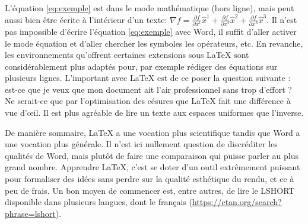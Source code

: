	L'équation \ref{eq:exemple} est dans le mode mathématique (hors ligne), mais peut aussi bien être écrite à l'intérieur d'un texte:
	\(
	\nabla f =%
	\frac{\partial f}{\partial x^1}\widehat{x}^1%
	+\frac{\partial f}{\partial x^2}\widehat{x}^2%
	+\frac{\partial f}{\partial x^3}\widehat{x}^3
	\).
	Il n'est pas impossible d'écrire l'équation \ref{eq:exemple} avec Word, il suffit d'aller activer le mode équation et d'aller chercher les symboles les opérateurs, etc. En revanche, les environnements qu'offrent certaines extensions sous \LaTeX{} sont considérablement plus adaptés pour, par exemple rédiger des équations sur plusieurs lignes. L'important avec \LaTeX{} est de ce poser la question suivante : est-ce que je veux que mon document ait l'air professionnel sans trop d'effort ? Ne serait-ce que par l'optimisation des césures que \LaTeX{} fait une différence à vue d'\oe il. Il est plus agréable de lire un texte aux espaces uniformes que l'inverse.
	\par De manière sommaire, \LaTeX{} a une vocation plus scientifique tandis que Word a une vocation plus générale. Il n'est ici nullement question de discréditer les qualités de Word, mais plutôt de faire une comparaison qui puisse parler au plus grand nombre. Apprendre \LaTeX, c'est se doter d'un outil extrêmement puissant pour formaliser des idées sans perdre sur la qualité esthétique du rendu, et ce à peu de frais. Un bon moyen de commencer est, entre autres, de lire le LSHORT disponible dans plusieurs langues, dont le français (\url{https://ctan.org/search?phrase=lshort}).
	
